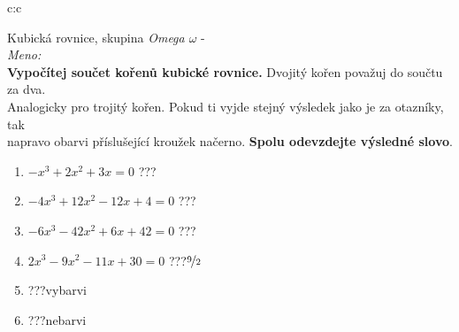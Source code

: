 \documentclass[10pt]{report}
\begin{document}
\clearpage
\thispagestyle{empty}
\begin{tabular}{c:c}
\begin{minipage}[c][99mm][t]{0.49\linewidth}
\begin{center}
\vspace{7mm}
{\huge Kubická rovnice, skupina \textit{Omega $\omega$} -}\\[4.5mm]
\textit{Meno:}\phantom{xxxxxxxxxxxxxxxxxxxxxxxxxxxxxxxxxxxxxxxxxxxxxxxxxxxxxxxxxxxxxxxxx}\\[3.5mm]
\textbf{Vypočítej součet kořenů kubické rovnice.} Dvojitý kořen považuj do součtu za dva.\\Analogicky pro trojitý kořen. Pokud ti vyjde stejný výsledek jako je za otazníky, tak\\napravo obarvi příslušející kroužek načerno. \textbf{Spolu odevzdejte výsledné slovo}.\\[3mm]
\begin{minipage}{0.77\linewidth}
\begin{center}
\begin{varwidth}{\textwidth}
\begin{enumerate}
\large
\item $-x^3+2x^2+3x=0$\quad \dotfill\; ???\;\dotfill {}
\item $-4x^3+12x^2-12x+4=0$\quad \dotfill\; ???\;\dotfill {}
\item $-6x^3-42x^2+6x+42=0$\quad \dotfill\; ???\;\dotfill {}
\item $2x^3-9x^2-11x+30=0$\quad \dotfill\; ???\;\dotfill \quad $\nicefrac{9}{2}$
\item \quad \dotfill\; ???\;\dotfill \quad vybarvi
\item \quad \dotfill\; ???\;\dotfill \quad nebarvi
\end{enumerate}
\end{varwidth}
\end{center}
\end{minipage}
\begin{minipage}{0.20\linewidth}
\begin{center}

\end{center}
\end{minipage}
\end{center}
\end{minipage}
\end{tabular}
\end{document}
